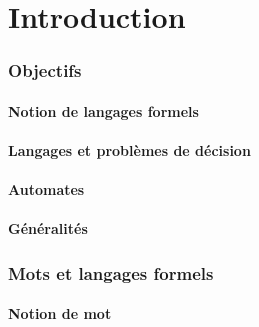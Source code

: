 
\begingroup

\part{Introduction}
 
 
\section{Objectifs}
 
\subsection{Notion de langages formels}




 
\subsection{Langages et problèmes de décision}




 
\subsection{Automates}


 
\subsection{Généralités} 


 
 
 
\section{Mots et langages formels}
 
\subsection{Notion de mot}







 
